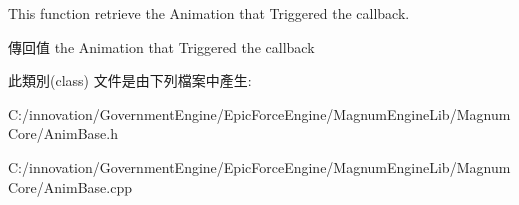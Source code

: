 This function retrieve the Animation that Triggered the callback. 

\begin{DoxyReturn}{傳回值}
the Animation that Triggered the callback 
\end{DoxyReturn}


此類別(class) 文件是由下列檔案中產生\+:\begin{DoxyCompactItemize}
\item 
C\+:/innovation/\+Government\+Engine/\+Epic\+Force\+Engine/\+Magnum\+Engine\+Lib/\+Magnum\+Core/Anim\+Base.\+h\item 
C\+:/innovation/\+Government\+Engine/\+Epic\+Force\+Engine/\+Magnum\+Engine\+Lib/\+Magnum\+Core/Anim\+Base.\+cpp\end{DoxyCompactItemize}
